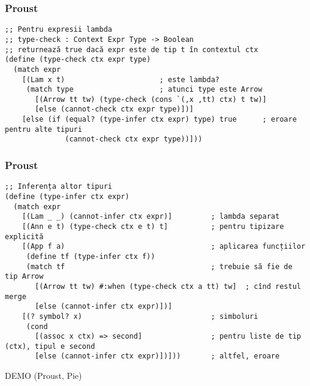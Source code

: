 \documentclass[xcolor=dvipsnames,handout]{beamer}
\newcommand{\ft}[1]{\frametitle{\color{bleumarin}{\hfill #1 \hfill}}}
\begin{document}
\begin{frame}[fragile]
  \frametitle{\hfill Proust \hfill}

  {\footnotesize
\begin{verbatim}
;; Pentru expresii lambda
;; type-check : Context Expr Type -> Boolean
;; returnează true dacă expr este de tip t în contextul ctx
(define (type-check ctx expr type)
  (match expr
	[(Lam x t)                      ; este lambda?
	 (match type                    ; atunci type este Arrow
	   [(Arrow tt tw) (type-check (cons `(,x ,tt) ctx) t tw)]
	   [else (cannot-check ctx expr type)])]
	[else (if (equal? (type-infer ctx expr) type) true      ; eroare pentru alte tipuri
			  (cannot-check ctx expr type))]))
\end{verbatim}
  }
\end{frame}


\begin{frame}[fragile]
  \frametitle{\hfill Proust \hfill}

  {\footnotesize
\begin{verbatim}
;; Inferența altor tipuri
(define (type-infer ctx expr)
  (match expr
	[(Lam _ _) (cannot-infer ctx expr)]         ; lambda separat
	[(Ann e t) (type-check ctx e t) t]          ; pentru tipizare explicită
	[(App f a)                                  ; aplicarea funcțiilor
	 (define tf (type-infer ctx f))
	 (match tf                                  ; trebuie să fie de tip Arrow
	   [(Arrow tt tw) #:when (type-check ctx a tt) tw]  ; cînd restul merge
	   [else (cannot-infer ctx expr)])]
	[(? symbol? x)                              ; simboluri
	 (cond
	   [(assoc x ctx) => second]                ; pentru liste de tip (ctx), tipul e second
	   [else (cannot-infer ctx expr)])]))       ; altfel, eroare
\end{verbatim}
  }
\end{frame}

\begin{frame}[plain,c]

  \begin{center}
    \Huge DEMO (Proust, Pie)
  \end{center}

\end{frame}


\begin{frame}[allowframebreaks]
  \ft{Bibliografie și lecturi suplimentare}
  
  
\end{frame}
\end{document}
